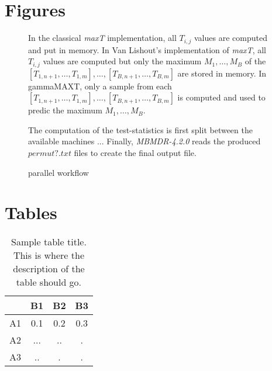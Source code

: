 \documentclass{bmcart}
\begin{document}
\begin{backmatter}

\section*{Figures}
  \begin{figure}[h!]
  \caption{
In the classical {\em maxT} implementation, all $T_{i,j}$ values are computed and put in memory. In Van Lishout's implementation of {\em maxT}, all $T_{i,j}$ values are computed but only the maximum $M_1,\ldots,M_B$ of the $[T_{1,n+1}, \ldots, T_{1,m}], \ldots, [T_{B,n+1}, \ldots, T_{B,m}]$ are stored in memory. In gammaMAXT, only a sample from each $[T_{1,n+1}, \ldots, T_{1,m}], \ldots, [T_{B,n+1}, \ldots, T_{B,m}]$ is computed and used to predic the maximum $M_1,\ldots,M_B$.}
      \end{figure}

  \begin{figure}[h!]
  \caption{ parallel workflow}
The computation of the test-statistics is first split between the available machines ... Finally, {\em MBMDR-4.2.0} reads the produced $permut?.txt$ files to create the final output file.
      \end{figure}


\section*{Tables}

\begin{table}[h!]
\caption{Sample table title. This is where the description of the table should go.}
      \begin{tabular}{cccc}
        \hline
           & B1  &B2   & B3\\ \hline
        A1 & 0.1 & 0.2 & 0.3\\
        A2 & ... & ..  & .\\
        A3 & ..  & .   & .\\ \hline
      \end{tabular}
\end{table}


\end{backmatter}
\end{document}
